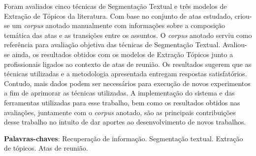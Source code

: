 \begin{resumo}
% 
% 
% 
% 
Foram avaliados cinco técnicas de Segmentação Textual e três modelos de Extração de Tópicos da literatura. Com base no conjunto de atas estudado, criou-se um \textit{corpus} anotado manualmente com informações sobre a composição temática das atas e as transições entre os assuntos. O \textit{corpus} anotado serviu como referência para avaliação objetiva das técnicas de Segmentação Textual. Avaliou-se ainda, os resultados obtidos com os modelos de Extração Tópicos junto a profissionais ligados ao contexto de atas de reunião.
% 
% 
% 
% 
Os resultados sugerem que as técnicas utilizadas e a metodologia apresentada entregam respostas satisfatórios. Contudo, mais dados podem ser necessários para execução de novos experimentos a fim de aprimorar as técnicas utilizadas.
% 
% 
% 
% 
% 
A implementação do sistema e das ferramentas utilizadas para esse trabalho, bem como os resultados obtidos nas avaliações, juntamente com o \textit{corpus} anotado, são as principais contribuições desse trabalho no intuito de dar aportes ao desenvolvimento de novos trabalhos.
% 
% 
% 
% 
% 


\textbf{Palavras-chaves}: 
Recuperação de informação. 
Segmentação textual. 
Extração de tópicos.
Atas de reunião.

\end{resumo}


